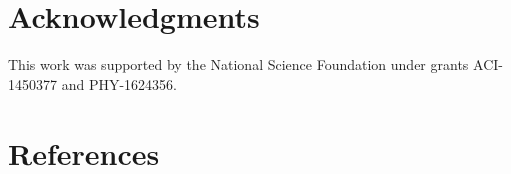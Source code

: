 \documentclass[a4paper]{jpconf}
\begin{document}




\section{Acknowledgments}

This work was supported by the National Science Foundation under grants ACI-1450377 and PHY-1624356.

\section*{References}
{}

\end{document}
